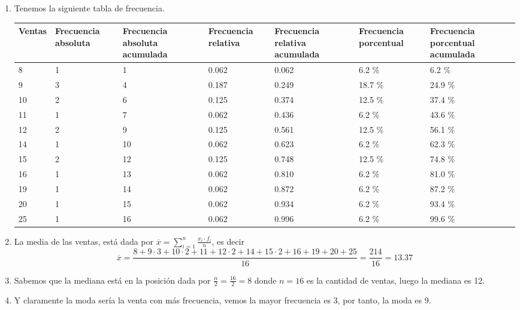 \begin{solution}
    \begin{enumerate}
        \item Tenemos la siguiente tabla de frecuencia.
        \begin{table}[H]
            \centering
            \begin{tabular}{|p{1.7cm}|p{1.8cm}|p{2cm}|p{1.8cm}|p{2cm}|p{2cm}|p{2cm}|}
                \hline
                Ventas & Frecuencia absoluta & Frecuencia absoluta acumulada & Frecuencia relativa & Frecuencia relativa acumulada & Frecuencia porcentual & Frecuencia porcentual acumulada\\
                \hline\hline
                 8 & 1 &  1 & 0.062 & 0.062 &  6.2 \% &  6.2 \% \\\hline
                 9 & 3 &  4 & 0.187 & 0.249 & 18.7 \% & 24.9 \% \\\hline
                10 & 2 &  6 & 0.125 & 0.374 & 12.5 \% & 37.4 \% \\\hline
                11 & 1 &  7 & 0.062 & 0.436 &  6.2 \% & 43.6 \% \\\hline
                12 & 2 &  9 & 0.125 & 0.561 & 12.5 \% & 56.1 \% \\\hline
                14 & 1 & 10 & 0.062 & 0.623 &  6.2 \% & 62.3 \% \\\hline
                15 & 2 & 12 & 0.125 & 0.748 & 12.5 \% & 74.8 \% \\\hline
                16 & 1 & 13 & 0.062 & 0.810 &  6.2 \% & 81.0 \% \\\hline
                19 & 1 & 14 & 0.062 & 0.872 &  6.2 \% & 87.2 \% \\\hline
                20 & 1 & 15 & 0.062 & 0.934 &  6.2 \% & 93.4 \% \\\hline
                25 & 1 & 16 & 0.062 & 0.996 &  6.2 \% & 99.6 \% \\\hline
            \end{tabular}
        \end{table}
        \item La media de las ventas, está dada por $\overline{x} = \sum_{i = 1}^{n} \frac{x_i \cdot f_i}{n}$, es decir
        \[
            \overline{x} = \frac{8 + 9\cdot 3 + 10 \cdot 2 + 11 + 12\cdot 2 + 14 + 15\cdot 2 + 16 + 19 + 20 + 25}{16} = \frac{214}{16} = 13.37
        \]
        \item Sabemos que la mediana está en la posición dada por $\frac{n}{2} = \frac{16}{2} = 8$ donde $n = 16$ es la cantidad de ventas, luego la mediana es 12.
        \item Y claramente la moda sería la venta con más frecuencia, vemos la mayor frecuencia es 3, por tanto, la moda es 9. \qedhere
    \end{enumerate}
\end{solution}

